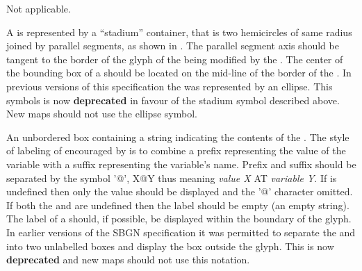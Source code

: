 \begin{glyphDescription}

\glyphSboTerm Not applicable.

\glyphContainer A  is represented by a
``stadium'' container, that is two hemicircles of same radius joined
by parallel segments, as shown in .  The parallel
segment axis should be tangent to the border of the glyph of the
 being modified by the . The center
of the bounding box of a  should be located on
the mid-line of the border of the . In previous versions of
this specification the  was represented by an
ellipse. This symbols is now \textbf{deprecated} in favour of the stadium
symbol described above. New \PD maps should not use the ellipse symbol.

\glyphLabel An unbordered box containing a string indicating the
contents of the . The style of labeling of
 encouraged by \SBGNPDLone is to combine a
prefix representing the value of the variable with a suffix
representing the variable's name.  Prefix and suffix should be
separated by the symbol '@', X@Y thus meaning \emph{value X} AT
\emph{variable Y}. If  is undefined then only the value
should be displayed and the '@' character omitted.  If both the
 and  are undefined then the label should
be empty (\ie an empty string). The label of a 
should, if possible, be displayed within the boundary of the glyph. In
earlier versions of the SBGN specification it was permitted to
separate the  and  into two unlabelled
boxes and display the  box outside the  glyph. This is now \textbf{deprecated} and new \PD maps
should not use this notation.



\end{glyphDescription}


